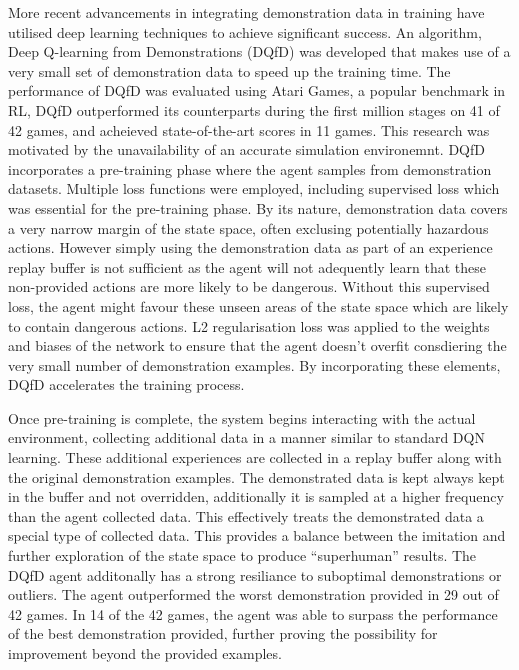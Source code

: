 
More recent advancements in integrating demonstration data in training have utilised deep learning techniques to achieve significant success\cite{deepQLearningFromDemo}.
An algorithm, Deep Q-learning from Demonstrations (DQfD) was developed that makes use of a very small set of demonstration data to speed up the training time.
The performance of DQfD was evaluated using Atari Games, a popular benchmark in RL, DQfD outperformed its counterparts during the first million stages on 41 of 42 games, and acheieved state-of-the-art scores in 11 games.
This research was motivated by the unavailability of an accurate simulation environemnt.
DQfD incorporates a pre-training phase where the agent samples from demonstration datasets.
Multiple loss functions were employed, including supervised loss which was essential for the pre-training phase.
By its nature, demonstration data covers a very narrow margin of the state space, often exclusing potentially hazardous actions.
However simply using the demonstration data as part of an experience replay buffer is not sufficient as the agent will not adequently learn that these non-provided actions are more likely to be dangerous.
Without this supervised loss, the agent might favour these unseen areas of the state space which are likely to contain dangerous actions.
L2 regularisation loss was applied to the weights and biases of the network to ensure that the agent doesn't overfit consdiering the very small number of demonstration examples.
By incorporating these elements, DQfD accelerates the training process.

Once pre-training is complete, the system begins interacting with the actual environment, collecting additional data in a manner similar to standard DQN learning.
These additional experiences are collected in a replay buffer along with the original demonstration examples.
The demonstrated data is kept always kept in the buffer and not overridden, additionally it is sampled at a higher frequency than the agent collected data.
This effectively treats the demonstrated data a special type of collected data.
This provides a balance between the imitation and further exploration of the state space to produce ``superhuman'' results.
The DQfD agent additonally has a strong resiliance to suboptimal demonstrations or outliers.
The agent outperformed the worst demonstration provided in 29 out of 42 games.
In 14 of the 42 games, the agent was able to surpass the performance of the best demonstration provided, further proving the possibility for improvement beyond the provided examples.

